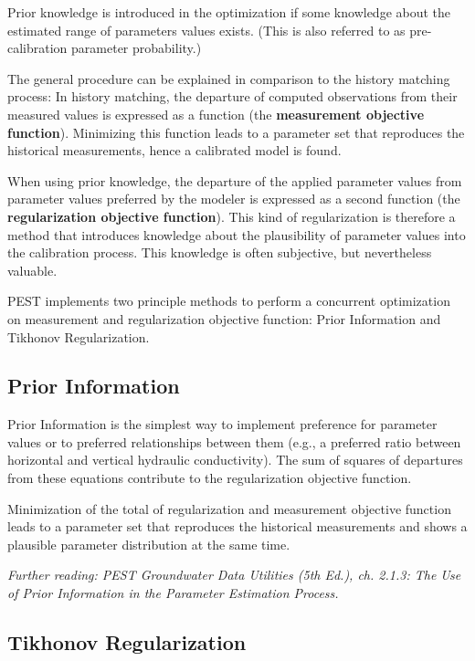 Prior knowledge is introduced in the optimization if some knowledge about the estimated range of parameters values exists. (This is also referred to as pre-calibration parameter probability.)

The general procedure can be explained in comparison to the history matching process: In history matching, the departure of computed observations from their measured values is expressed as a function (the \textbf{measurement objective function}). Minimizing this function leads to a parameter set that reproduces the historical measurements, hence a calibrated model is found.

When using prior knowledge, the departure of the applied parameter values from parameter values preferred by the modeler is expressed as a second function (the \textbf{regularization objective function}). This kind of regularization is therefore a method that introduces knowledge about the plausibility of parameter values into the calibration process. This knowledge is often subjective, but nevertheless valuable.

PEST implements two principle methods to perform a concurrent optimization on measurement and regularization objective function: Prior Information and Tikhonov Regularization.

\subsection{Prior Information}

Prior Information is the simplest way to implement preference for parameter values or to preferred relationships between them (e.g., a preferred ratio between horizontal and vertical hydraulic conductivity). The sum of squares of departures from these equations contribute to the regularization objective function. 

Minimization of the total of regularization and measurement objective function leads to a parameter set that reproduces the historical measurements and shows a plausible parameter distribution at the same time.

\textit{Further reading: PEST Groundwater Data Utilities (5th Ed.), ch. 2.1.3: The Use of Prior Information in the Parameter Estimation Process.}

\subsection{Tikhonov Regularization}
\label{sec:fepest:Tikhonov}

